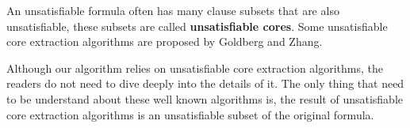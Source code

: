 \documentclass[journal]{IEEEtran}
\begin{document}
An unsatisfiable formula often has many clause subsets that are also unsatisfiable,
these subsets are called \textbf{unsatisfiable cores}.
Some unsatisfiable core extraction algorithms are proposed by Goldberg\cite{VERPROOF} and Zhang\cite{VALIDSAT}.

Although our algorithm relies on unsatisfiable core extraction algorithms,
the readers do not need to dive deeply into the details of it.
The only thing that need to be understand about these well known algorithms is,
the result of unsatisfiable core extraction algorithms is an unsatisfiable subset of the original formula.

%
%
\end{document}
